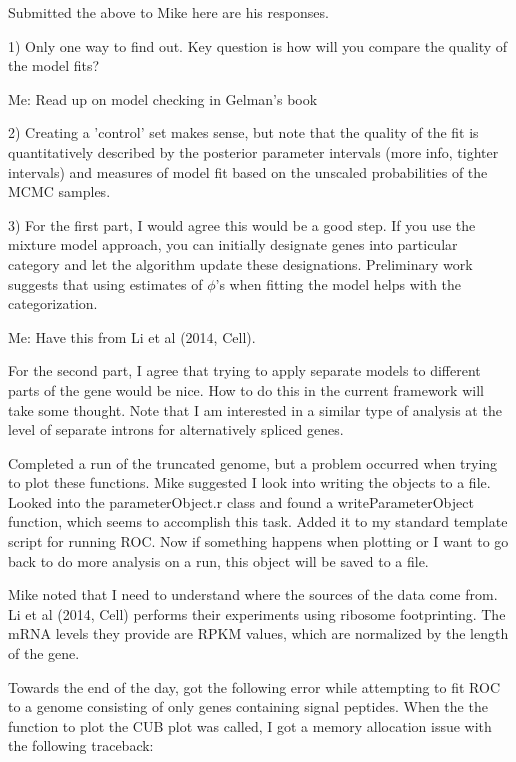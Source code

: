 \documentclass[11pt]{labbook}
\begin{document}
Submitted the above to Mike here are his responses.

1) Only one way to find out.  Key question is how will you compare the quality of the model fits? 

Me: Read up on model checking in Gelman's book

2) Creating a 'control' set makes sense, but note that the quality of the fit is quantitatively described by the  posterior parameter intervals (more info, tighter intervals) and measures of model fit based on the unscaled probabilities of the MCMC samples.

3) For the first part, I would agree this would be a good step. If you use the mixture model approach, you can initially designate genes into particular category and let the algorithm update these designations.  Preliminary work 
suggests that using estimates of $\phi$'s when fitting the model helps with the categorization.

Me: Have this from Li et al (2014, Cell). 

For the second part, I agree that trying to apply separate models to different parts of the gene would be nice.  How to do this in the current framework will take some thought.  Note that I am interested in a similar type of analysis at the level of separate introns for alternatively spliced 
genes. 

Completed a run of the truncated genome, but a problem occurred when trying to plot these functions. Mike suggested I look into writing the objects to a file. Looked into the parameterObject.r class and found a writeParameterObject function, which seems to accomplish this task. Added it to my standard template script for running ROC. Now if something happens when plotting or I want to go back to do more analysis on a run, this object will be saved to a file. 

Mike noted that I need to understand where the sources of the data come from. Li et al (2014, Cell) performs their experiments using ribosome footprinting. The mRNA levels they provide are RPKM values, which are normalized by the length of the gene. 


Towards the end of the day, got the following error while attempting to fit ROC to a genome consisting of only genes containing signal peptides. When the the function to plot the CUB plot was called, I got a memory allocation issue with the following traceback:
\end{document}
